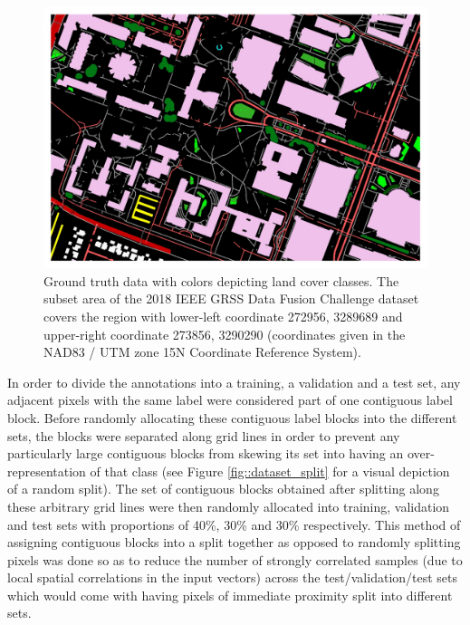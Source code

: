 \documentclass[
twocolumn,
]{ceurart}
\begin{document}

\begin{figure}[!t]
\centering
\includegraphics[width=\columnwidth]{figures/gt.jpg}
\caption{Ground truth data with colors depicting land cover classes. The subset area of the 2018 IEEE GRSS Data Fusion Challenge dataset covers the region with lower-left coordinate 272956, 3289689 and upper-right coordinate 273856, 3290290 (coordinates given in the NAD83 / UTM zone 15N Coordinate Reference System).}
\label{fig::gt}
\end{figure}

In order to divide the annotations into a training, a validation and a test set, any adjacent pixels with the same label were considered part of one contiguous label block.
Before randomly allocating these contiguous label blocks into the different sets, the blocks were separated along grid lines in order to prevent any particularly large contiguous blocks from skewing its set into having an over-representation of that class (see Figure \ref{fig::dataset_split} for a visual depiction of a random split).
The set of contiguous blocks obtained after splitting along these arbitrary grid lines were then randomly allocated into training, validation and test sets with proportions of 40\%, 30\% and 30\% respectively.
This method of assigning contiguous blocks into a split together as opposed to randomly splitting pixels was done so as to reduce the number of strongly correlated samples (due to local spatial correlations in the input vectors) across the test/validation/test sets which would come with having pixels of immediate proximity split into different sets.
\end{document}

